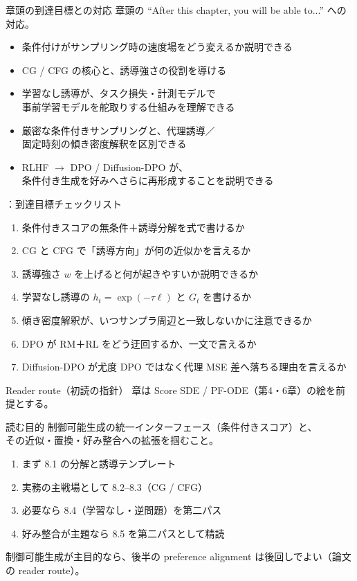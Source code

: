 \asmain
\begin{frame}{章頭の到達目標との対応}
    章頭の ``After this chapter, you will be able to...'' への対応。
    \begin{itemize}
        \item 条件付けがサンプリング時の速度場をどう変えるか説明できる
        \item CG / CFG の核心と、誘導強さの役割を導ける
        \item 学習なし誘導が、タスク損失・計測モデルで\\
        事前学習モデルを舵取りする仕組みを理解できる
        \item 厳密な条件付きサンプリングと、代理誘導／\\
        固定時刻の傾き密度解釈を区別できる
        \item RLHF $\to$ DPO / Diffusion-DPO が、\\
        条件付き生成を好みへさらに再形成することを説明できる
    \end{itemize}
\end{frame}
\assuppl
\begin{frame}{\supplmark：到達目標チェックリスト}
    \footnotesize
    \begin{enumerate}
        \item 条件付きスコアの無条件＋誘導分解を式で書けるか
        \item CG と CFG で「誘導方向」が何の近似かを言えるか
        \item 誘導強さ $w$ を上げると何が起きやすいか説明できるか
        \item 学習なし誘導の $h_t=\exp(-\tau\ell)$ と $G_t$ を書けるか
        \item 傾き密度解釈が、いつサンプラ周辺と一致しないかに注意できるか
        \item DPO が RM＋RL をどう迂回するか、一文で言えるか
        \item Diffusion-DPO が尤度 DPO ではなく代理 MSE 差へ落ちる理由を言えるか
    \end{enumerate}
\end{frame}
\asmain
\begin{frame}{Reader route（初読の指針）}
    章は Score SDE / PF-ODE（第4・6章）の絵を前提とする。
    \begin{block}{読む目的}
        制御可能生成の統一インターフェース（条件付きスコア）と、\\
        その近似・置換・好み整合への拡張を掴むこと。
    \end{block}
    \begin{enumerate}
        \item まず 8.1 の分解と誘導テンプレート
        \item 実務の主戦場として 8.2--8.3（CG / CFG）
        \item 必要なら 8.4（学習なし・逆問題）を第二パス
        \item 好み整合が主題なら 8.5 を第二パスとして精読
    \end{enumerate}
    \vfill
    \footnotesize
    制御可能生成が主目的なら、後半の preference alignment は後回しでよい（論文の reader route）。
\end{frame}
